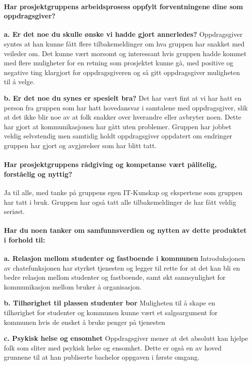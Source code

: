 \paragraph{Har prosjektgruppens arbeidsprosess oppfylt forventningene dine som oppdragsgiver?}

{\bf a. Er det noe du skulle ønske vi hadde gjort annerledes?}
Oppdragsgiver syntes at han kunne fått flere tilbakemeldinger om hva gruppen har snakket med veileder om. Det kunne vært morsomt og interessant hvis gruppen hadde kommet med flere muligheter for en retning som prosjektet kunne gå, med positive og negative ting klargjort for oppdragsgiveren og så gitt oppdragsgiver muligheten til å velge.

{\bf b. Er det noe du synes er spesielt bra?}
Det har vært fint at vi har hatt en person fra gruppen som har hatt hovedansvar i samtalene med oppdragsgiver, slik at det ikke blir noe av at folk snakker over hverandre eller avbryter noen. Dette har gjort at kommunikasjonen  har gått uten problemer. Gruppen har jobbet veldig selvstendig men samtidig holdt oppdragsgiver oppdatert om endringer gruppen har gjort og avgjørelser som har blitt tatt.

\paragraph{Har prosjektgruppens rådgiving og kompetanse vært pålitelig, forståelig og nyttig?}
Ja til alle, med tanke på gruppens egen IT-Kunskap og ekspertene som gruppen har tatt i bruk. Gruppen har også tatt alle tilbakemeldinger de har fått veldig seriøst.

\paragraph{Har du noen tanker om samfunnsverdien og nytten av dette produktet i forhold til:}

{\bf a. Relasjon mellom studenter og fastboende i kommunen}
Introduksjonen av chatefunksjonen har styrket tjenesten og legger til rette for at det kan bli en bedre relasjon mellom studenter og fastboende, samt økt sannsynlighet for kommunikasjon mellom bruker å organisasjon.

{\bf b. Tilhørighet til plassen studenter bor}
Muligheten til å skape en tilhørighet for studenter og kommunen kunne vært et salgsargument for kommunen hvis de ønsket å bruke penger på tjenesten

{\bf c. Psykisk helse og ensomhet}
Oppdragsgiver mener at det absolutt kan hjelpe folk som sliter med psykisk helse og ensomhet. Dette er også en av hoved grunnene til at han publiserte bachelor oppgaven i første omgang.

